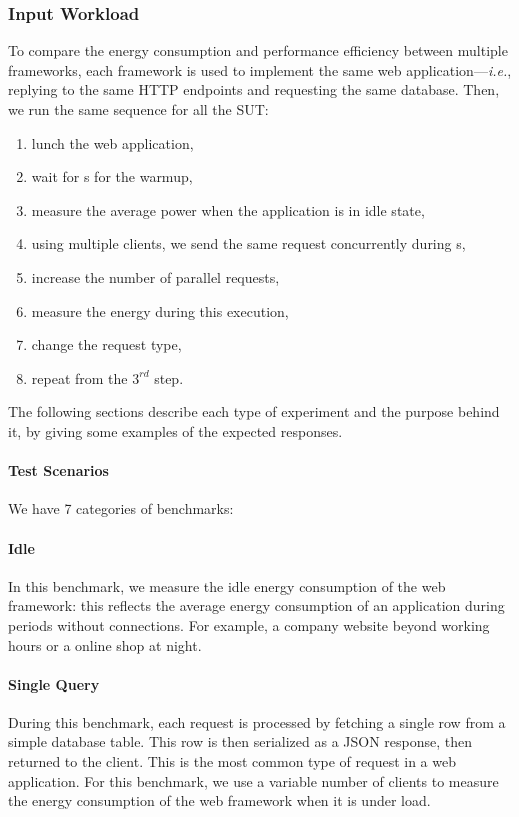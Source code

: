 \subsubsection{Input Workload}
To compare the energy consumption and performance efficiency between multiple frameworks, each framework is used to implement the same web application---\emph{i.e.}, replying to the same HTTP endpoints and requesting the same database. Then, we run the same sequence for all the SUT:
\begin{enumerate}
    \item lunch the web application,
    \item wait for \duration s for the warmup,
    \item measure the average power when the application is in idle state,
    \item using multiple clients, we send the same request concurrently during \duration s,
    \item increase the number of parallel requests,
    \item measure the energy during this execution,
    \item change the request type,
    \item repeat from the $3^{rd}$ step.
\end{enumerate}

The following sections describe each type of experiment and the purpose behind it, by giving some examples of the expected responses.

\paragraph{Test Scenarios}
We have 7 categories of benchmarks:
\paragraph{Idle}
In this benchmark, we measure the idle energy consumption of the web framework: this reflects the average energy consumption of an application during periods without connections.
For example, a company website beyond working hours or a online shop at night.

\paragraph{Single Query}
During this benchmark, each request is processed by fetching a single row from a simple database table.
This row is then serialized as a JSON response, then returned to the client.
This is the most common type of request in a web application.
For this benchmark, we use a variable number of clients to measure the energy consumption of the web framework when it is under load.

